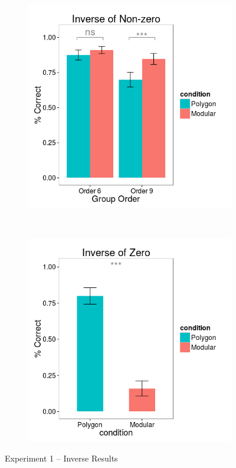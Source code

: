 \documentclass[11pt]{article}
\begin{document}
\begin{figure}[H]
\centering
\begin{subfigure}[c]{0.4\textwidth}
\centering
\includegraphics[width=\textwidth]{figures/1/in_NZ_r.png}
\end{subfigure}
~
\begin{subfigure}[c]{0.4\textwidth}
\centering
\includegraphics[width=\textwidth]{figures/1/in_Z_r.png}
\end{subfigure}
\caption{Experiment 1 -- Inverse Results}
\label{ex1_in}
\end{figure}\noindent 
\end{document}

